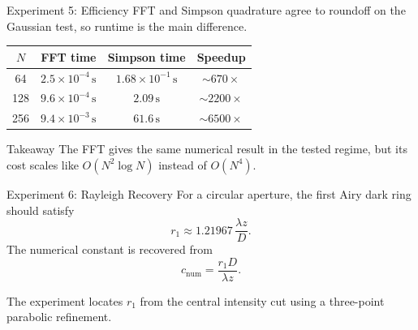 \documentclass[aspectratio=169,11pt]{beamer}
\begin{document}
\begin{frame}{Experiment 5: Efficiency}
    FFT and Simpson quadrature agree to roundoff on the Gaussian test, so runtime is the main difference.

    \vspace{0.25cm}
    \begin{center}
    \begin{tabular}{cccc}
        \toprule
        \(N\) & FFT time & Simpson time & Speedup \\
        \midrule
        64 & \(2.5\times10^{-4}\,\mathrm{s}\) & \(1.68\times10^{-1}\,\mathrm{s}\) & \(\sim670\times\) \\
        128 & \(9.6\times10^{-4}\,\mathrm{s}\) & \(2.09\,\mathrm{s}\) & \(\sim2200\times\) \\
        256 & \(9.4\times10^{-3}\,\mathrm{s}\) & \(61.6\,\mathrm{s}\) & \(\sim6500\times\) \\
        \bottomrule
    \end{tabular}
    \end{center}

    \vspace{0.2cm}
    \begin{block}{Takeaway}
        The FFT gives the same numerical result in the tested regime, but its cost scales like
        \(O(N^2\log N)\) instead of \(O(N^4)\).
    \end{block}
\end{frame}

\begin{frame}{Experiment 6: Rayleigh Recovery}
    For a circular aperture, the first Airy dark ring should satisfy
    \[
        r_1\approx 1.21967\,\frac{\lambda z}{D}.
    \]
    The numerical constant is recovered from
    \[
        c_{\mathrm{num}}=\frac{r_1D}{\lambda z}.
    \]

    \vspace{0.2cm}
    The experiment locates \(r_1\) from the central intensity cut using a three-point parabolic refinement.
\end{frame}
\end{document}
